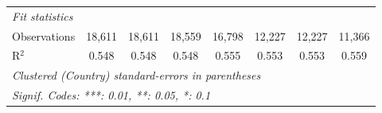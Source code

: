 \begin{tabular}{lccccccc}
   \midrule \emph{Fit statistics}\\
   Observations                                                                                 & 18,611  & 18,611  & 18,559  & 16,798  & 12,227        & 12,227        & 11,366\\  
   R$^2$                                                                                        & 0.548   & 0.548   & 0.548   & 0.555   & 0.553         & 0.553         & 0.559\\  
   \midrule
   \multicolumn{8}{l}{\emph{Clustered (Country) standard-errors in parentheses}}\\
   \multicolumn{8}{l}{\emph{Signif. Codes: ***: 0.01, **: 0.05, *: 0.1}}\\
\end{tabular}
\par\endgroup



